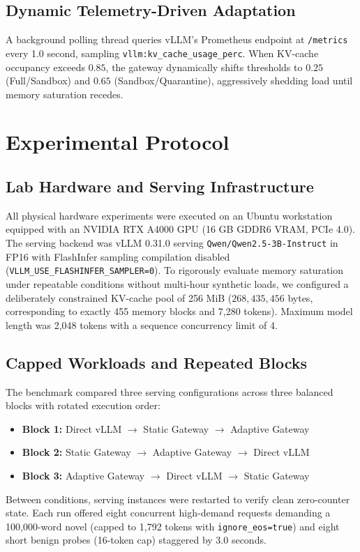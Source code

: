 \documentclass[runningheads]{article}
\begin{document}
\subsection{Dynamic Telemetry-Driven Adaptation}
A background polling thread queries vLLM's Prometheus endpoint at \texttt{/metrics} every 1.0 second, sampling \texttt{vllm:kv\_cache\_usage\_perc}. When KV-cache occupancy exceeds $0.85$, the gateway dynamically shifts thresholds to $0.25$ (Full/Sandbox) and $0.65$ (Sandbox/Quarantine), aggressively shedding load until memory saturation recedes.

\section{Experimental Protocol}

\subsection{Lab Hardware and Serving Infrastructure}
All physical hardware experiments were executed on an Ubuntu workstation equipped with an NVIDIA RTX A4000 GPU (16 GB GDDR6 VRAM, PCIe 4.0). The serving backend was vLLM 0.31.0 serving \texttt{Qwen/Qwen2.5-3B-Instruct} in FP16 with FlashInfer sampling compilation disabled (\texttt{VLLM\_USE\_FLASHINFER\_SAMPLER=0}). To rigorously evaluate memory saturation under repeatable conditions without multi-hour synthetic loads, we configured a deliberately constrained KV-cache pool of 256 MiB ($268,435,456$ bytes, corresponding to exactly 455 memory blocks and 7,280 tokens). Maximum model length was 2,048 tokens with a sequence concurrency limit of 4.

\subsection{Capped Workloads and Repeated Blocks}
The benchmark compared three serving configurations across three balanced blocks with rotated execution order:
\begin{itemize}
    \item \textbf{Block 1:} Direct vLLM $\rightarrow$ Static Gateway $\rightarrow$ Adaptive Gateway
    \item \textbf{Block 2:} Static Gateway $\rightarrow$ Adaptive Gateway $\rightarrow$ Direct vLLM
    \item \textbf{Block 3:} Adaptive Gateway $\rightarrow$ Direct vLLM $\rightarrow$ Static Gateway
\end{itemize}
Between conditions, serving instances were restarted to verify clean zero-counter state. Each run offered eight concurrent high-demand requests demanding a 100,000-word novel (capped to 1,792 tokens with \texttt{ignore\_eos=true}) and eight short benign probes (16-token cap) staggered by 3.0 seconds.
\end{document}
